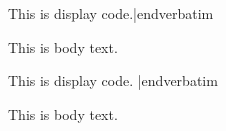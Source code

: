

\def\displaycode#1{%
	\par\vskip\baselineskip\leavevmode%
	\hskip 2em\hbox{\tentt #1}\par\vskip\baselineskip%
}

\verbatim This 
is 
display 
code.|endverbatim

This is body text.

\verbatim 
This 
is 
display 
code.
|endverbatim


This is body text.

\bye
